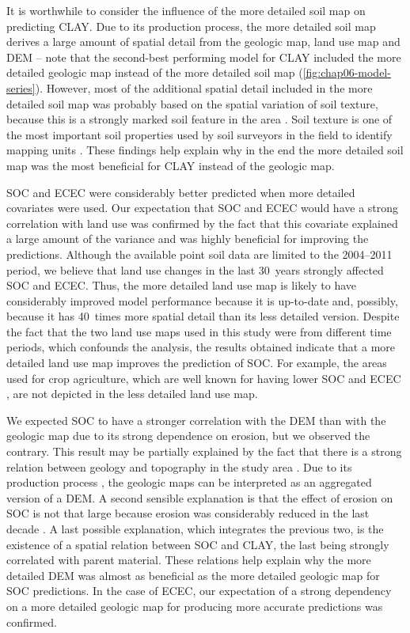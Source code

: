 It is worthwhile to consider the influence of the more detailed soil map on predicting CLAY. Due to its 
production process, the more detailed soil map derives a large amount of spatial detail from the geologic map, 
land use map and DEM -- note that the second-best performing model for CLAY included the more detailed 
geologic map instead of the more detailed soil map (\autoref{fig:chap06-model-series}). However, most of the 
additional spatial detail included in the more detailed soil map was probably based on the spatial variation 
of soil texture, because this is a strongly marked soil feature in the area \cite{MiguelEtAl2012}. Soil 
texture is one of the most important soil properties used by soil surveyors in the field to identify mapping 
units \cite{Legros2006}. These findings help explain why in the end the more detailed soil map was the most 
beneficial for CLAY instead of the geologic map.

SOC and ECEC were considerably better predicted when more detailed covariates were used. Our expectation that 
SOC and ECEC would have a strong correlation with land use was confirmed by the fact that this covariate 
explained a large amount of the variance and was highly beneficial for improving the predictions. Although the 
available point soil data are limited to the \num{2004}--\num{2011} period, we believe that land use changes 
in the last \num{30}~years \cite{MiguelEtAl2012, TenCatenEtAl2012b} strongly affected SOC and ECEC. Thus, the 
more detailed land use map is likely to have considerably improved model performance because it is up-to-date 
and, possibly, because it has \num{40}~times more spatial detail than its less detailed version. Despite the 
fact that the two land use maps used in this study were from different time periods, which confounds the 
analysis, the results obtained indicate that a more detailed land use map improves the prediction of SOC. For 
example, the areas used for crop agriculture, which are well known for having lower SOC and ECEC 
\cite{Menezes2008, MouraBueno2012}, are not depicted in the less detailed land use map.

We expected SOC to have a stronger correlation with the DEM than with the geologic map due to its strong 
dependence on erosion, but we observed the contrary. This result may be partially explained by the fact that 
there is a strong relation between geology and topography in the study area \cite{Sartori2009}. Due to its 
production process \cite{MacielFilho1990}, the geologic maps can be interpreted as an aggregated version of a 
DEM. A second sensible explanation is that the effect of erosion on SOC is not that large because erosion was 
considerably reduced in the last decade \cite{MiguelEtAl2012, TenCatenEtAl2012b}. A last possible explanation, 
which integrates the previous two, is the existence of a spatial relation between SOC and CLAY, the last being 
strongly correlated with parent material. These relations help explain why the more detailed DEM was almost as 
beneficial as the more detailed geologic map for SOC predictions. In the case of ECEC, our expectation of a 
strong dependency on a more detailed geologic map for producing more accurate predictions was confirmed.


